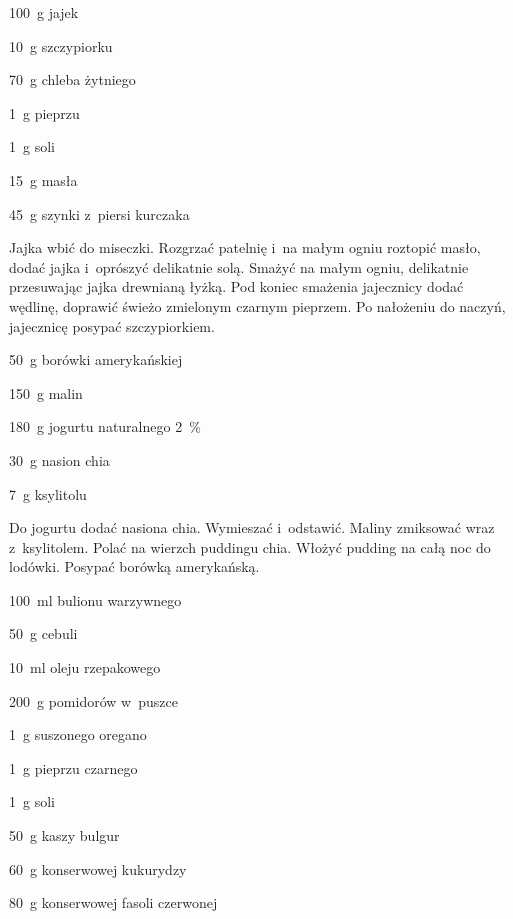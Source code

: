 \documentclass[../main.tex]{subfiles}
\begin{document}
\begin{Ingred}
    \item \qty{100}{\gram} jajek
    \item \qty{10}{\gram} szczypiorku
    \item \qty{70}{\gram} chleba żytniego
    \item \qty{1}{\gram} pieprzu
    \item \qty{1}{\gram} soli
    \item \qty{15}{\gram} masła
    \item \qty{45}{\gram} szynki z~piersi kurczaka
\end{Ingred}

Jajka wbić do miseczki. Rozgrzać patelnię i~na małym ogniu roztopić masło,
dodać jajka i~oprószyć delikatnie solą. Smażyć na małym ogniu, delikatnie
przesuwając jajka drewnianą łyżką. Pod koniec smażenia jajecznicy dodać
wędlinę, doprawić świeżo zmielonym czarnym pieprzem. Po nałożeniu do naczyń,
jajecznicę posypać szczypiorkiem.


\begin{Ingred}
    \item \qty{50}{\gram} borówki amerykańskiej
    \item \qty{150}{\gram} malin
    \item \qty{180}{\gram} jogurtu naturalnego \qty{2}{\percent}
    \item \qty{30}{\gram} nasion chia
    \item \qty{7}{\gram} ksylitolu
\end{Ingred}

Do jogurtu dodać nasiona chia. Wymieszać i~odstawić. Maliny zmiksować wraz
z~ksylitolem. Polać na wierzch puddingu chia. Włożyć pudding na całą noc do
lodówki. Posypać borówką amerykańską.


\begin{Ingred}
    \item \qty{100}{\milli\litre} bulionu warzywnego
    \item \qty{50}{\gram} cebuli
    \item \qty{10}{\milli\litre} oleju rzepakowego
    \item \qty{200}{\gram} pomidorów w~puszce
    \item \qty{1}{\gram} suszonego oregano
    \item \qty{1}{\gram} pieprzu czarnego
    \item \qty{1}{\gram} soli
    \item \qty{50}{\gram} kaszy bulgur
    \item \qty{60}{\gram} konserwowej kukurydzy
    \item \qty{80}{\gram} konserwowej fasoli czerwonej
\end{Ingred}
\end{document}
